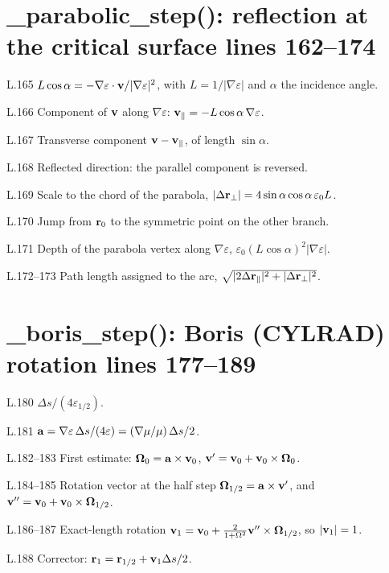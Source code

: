 \section*{\normalsize \_parabolic\_step(): reflection at the critical surface \hfill{\small\mdseries\color{gray}lines 162--174}}

\begin{lines}
\item[L.165] $L\cos\alpha=-\nabla\varepsilon\cdot\mathbf{v}/|\nabla\varepsilon|^2$, with $L=1/|\nabla\varepsilon|$ and $\alpha$ the incidence angle.
\item[L.166] Component of $\mathbf{v}$ along $\nabla\varepsilon$: $\mathbf{v}_\parallel=-L\cos\alpha\,\nabla\varepsilon$.
\item[L.167] Transverse component $\mathbf{v}-\mathbf{v}_\parallel$, of length $\sin\alpha$.
\item[L.168] Reflected direction: the parallel component is reversed.
\item[L.169] Scale to the chord of the parabola, $|\Delta\mathbf{r}_\perp|=4\sin\alpha\cos\alpha\,\varepsilon_0 L$.
\item[L.170] Jump from $\mathbf{r}_0$ to the symmetric point on the other branch.
\item[L.171] Depth of the parabola vertex along $\nabla\varepsilon$, $\varepsilon_0(L\cos\alpha)^2|\nabla\varepsilon|$.
\item[L.172–173] Path length assigned to the arc, $\sqrt{|2\Delta\mathbf{r}_\parallel|^2+|\Delta\mathbf{r}_\perp|^2}$.
\end{lines}
\section*{\normalsize \_boris\_step(): Boris (CYLRAD) rotation \hfill{\small\mdseries\color{gray}lines 177--189}}

\begin{lines}
\item[L.180] $\Delta s/(4\varepsilon_{1/2})$.
\item[L.181] $\mathbf{a}=\nabla\varepsilon\,\Delta s/(4\varepsilon)=(\nabla\mu/\mu)\,\Delta s/2$.
\item[L.182–183] First estimate: $\mathbf{\Omega}_0=\mathbf{a}\times\mathbf{v}_0$, $\mathbf{v}'=\mathbf{v}_0+\mathbf{v}_0\times\mathbf{\Omega}_0$.
\item[L.184–185] Rotation vector at the half step $\mathbf{\Omega}_{1/2}=\mathbf{a}\times\mathbf{v}'$, and $\mathbf{v}''=\mathbf{v}_0+\mathbf{v}_0\times\mathbf{\Omega}_{1/2}$.
\item[L.186–187] Exact-length rotation $\mathbf{v}_1=\mathbf{v}_0+\frac{2}{1+\Omega^2}\mathbf{v}''\times\mathbf{\Omega}_{1/2}$, so $|\mathbf{v}_1|=1$.
\item[L.188] Corrector: $\mathbf{r}_1=\mathbf{r}_{1/2}+\mathbf{v}_1\Delta s/2$.
\end{lines}
